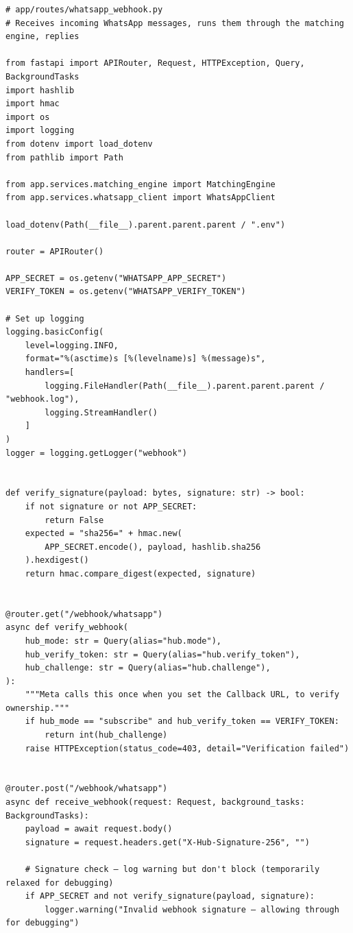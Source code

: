 \documentclass[12pt, a4paper]{report}
\begin{document}
\begin{lstlisting}[style=pythonstyle, caption={WhatsApp Webhook Receiver --- Full Implementation}]
# app/routes/whatsapp_webhook.py
# Receives incoming WhatsApp messages, runs them through the matching engine, replies

from fastapi import APIRouter, Request, HTTPException, Query, BackgroundTasks
import hashlib
import hmac
import os
import logging
from dotenv import load_dotenv
from pathlib import Path

from app.services.matching_engine import MatchingEngine
from app.services.whatsapp_client import WhatsAppClient

load_dotenv(Path(__file__).parent.parent.parent / ".env")

router = APIRouter()

APP_SECRET = os.getenv("WHATSAPP_APP_SECRET")
VERIFY_TOKEN = os.getenv("WHATSAPP_VERIFY_TOKEN")

# Set up logging
logging.basicConfig(
    level=logging.INFO,
    format="%(asctime)s [%(levelname)s] %(message)s",
    handlers=[
        logging.FileHandler(Path(__file__).parent.parent.parent / "webhook.log"),
        logging.StreamHandler()
    ]
)
logger = logging.getLogger("webhook")


def verify_signature(payload: bytes, signature: str) -> bool:
    if not signature or not APP_SECRET:
        return False
    expected = "sha256=" + hmac.new(
        APP_SECRET.encode(), payload, hashlib.sha256
    ).hexdigest()
    return hmac.compare_digest(expected, signature)


@router.get("/webhook/whatsapp")
async def verify_webhook(
    hub_mode: str = Query(alias="hub.mode"),
    hub_verify_token: str = Query(alias="hub.verify_token"),
    hub_challenge: str = Query(alias="hub.challenge"),
):
    """Meta calls this once when you set the Callback URL, to verify ownership."""
    if hub_mode == "subscribe" and hub_verify_token == VERIFY_TOKEN:
        return int(hub_challenge)
    raise HTTPException(status_code=403, detail="Verification failed")


@router.post("/webhook/whatsapp")
async def receive_webhook(request: Request, background_tasks: BackgroundTasks):
    payload = await request.body()
    signature = request.headers.get("X-Hub-Signature-256", "")

    # Signature check — log warning but don't block (temporarily relaxed for debugging)
    if APP_SECRET and not verify_signature(payload, signature):
        logger.warning("Invalid webhook signature — allowing through for debugging")


\end{lstlisting}
\end{document}
